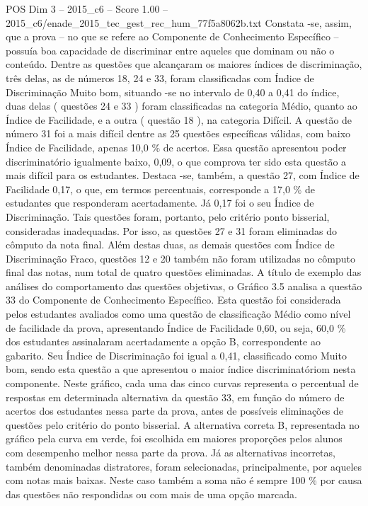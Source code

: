 \begin{textsample}{POS Dim 3 – 2015\_c6 – Score 1.00 – 2015\_c6/enade\_2015\_tec\_gest\_rec\_hum\_77f5a8062b.txt}
Constata -se, assim, que a prova – no que se refere ao Componente de Conhecimento Específico – possuía boa capacidade de discriminar entre aqueles que dominam ou não o conteúdo.
Dentre as questões que alcançaram os maiores índices de discriminação, três delas, as de números 18, 24 e 33, foram classificadas com Índice de Discriminação Muito bom, situando -se no intervalo de 0,40 a 0,41 do índice, duas delas ( questões 24 e 33 ) foram classificadas na categoria Médio, quanto ao Índice de Facilidade, e a outra ( questão 18 ), na categoria Difícil.
A questão de número 31 foi a mais difícil dentre as 25 questões específicas válidas, com baixo Índice de Facilidade, apenas 10,0 \% de acertos.
Essa questão apresentou poder discriminatório igualmente baixo, 0,09, o que comprova ter sido esta questão a mais difícil para os estudantes.
Destaca -se, também, a questão 27, com Índice de Facilidade 0,17, o que, em termos percentuais, corresponde a 17,0 \% de estudantes que responderam acertadamente.
Já 0,17 foi o seu Índice de Discriminação.
Tais questões foram, portanto, pelo critério ponto bisserial, consideradas inadequadas.
Por isso, as questões 27 e 31 foram eliminadas do cômputo da nota final.
Além destas duas, as demais questões com Índice de Discriminação Fraco, questões 12 e 20 também não foram utilizadas no cômputo final das notas, num total de quatro questões eliminadas.
A título de exemplo das análises do comportamento das questões objetivas, o Gráfico 3.5 analisa a questão 33 do Componente de Conhecimento Específico.
Esta questão foi considerada pelos estudantes avaliados como uma questão de classificação Médio como nível de facilidade da prova, apresentando Índice de Facilidade 0,60, ou seja, 60,0 \% dos estudantes assinalaram acertadamente a opção B, correspondente ao gabarito.
Seu Índice de Discriminação foi igual a 0,41, classificado como Muito bom, sendo esta questão a que apresentou o maior índice discriminatóriom nesta componente.
Neste gráfico, cada uma das cinco curvas representa o percentual de respostas em determinada alternativa da questão 33, em função do número de acertos dos estudantes nessa parte da prova, antes de possíveis eliminações de questões pelo critério do ponto bisserial.
A alternativa correta B, representada no gráfico pela curva em verde, foi escolhida em maiores proporções pelos alunos com desempenho melhor nessa parte da prova.
Já as alternativas incorretas, também denominadas distratores, foram selecionadas, principalmente, por aqueles com notas mais baixas.
Neste caso também a soma não é sempre 100 \% por causa das questões não respondidas ou com mais de uma opção marcada.

\end{textsample}

